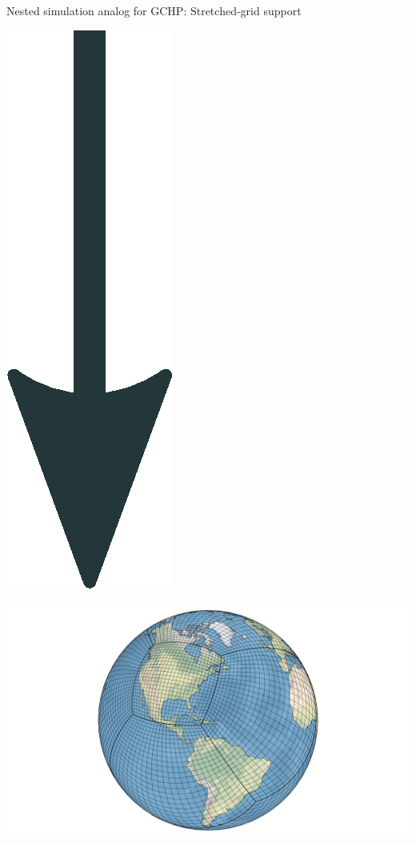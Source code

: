 \documentclass[10pt]{beamer}
\begin{document}
\begin{frame}[fragile]{Nested simulation analog for GCHP: Stretched-grid support}
\begin{minipage}[c]{0.48\textwidth}
\begin{center}
        \end{center}
        \begin{center}
            \includegraphics[height=0.05\textheight]{downarrow.eps}
        \end{center}
        \begin{center}
            \includegraphics[height=0.3\textheight]{scs_2.png}
        \end{center}
    \end{minipage}
\end{frame}
\end{document}
